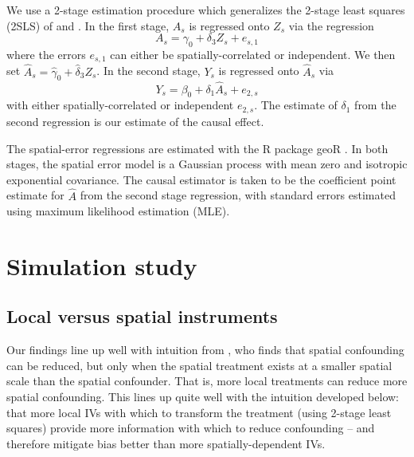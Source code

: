 \documentclass[12pt]{article}
\begin{document}
We use a 2-stage estimation procedure which generalizes the 2-stage least squares (2SLS) of  \cite{wright1928tariff} and \cite{theil1958economic}. In the first stage, $A_s$ is regressed onto $Z_s$ via the regression $$A_s = \gamma_0 + \delta_3 Z_s + e_{s,1}$$ where the errors $e_{s,1}$ can either be spatially-correlated or independent. We then set $\hat{A}_s = \hat{\gamma}_0 + \hat{\delta}_3 Z_s$. In the second stage, $Y_s$ is regressed onto $\hat{A}_s$ via $$Y_s = \beta_0 + \delta_1 \hat{A}_s + e_{2,s}$$ with either spatially-correlated or independent $e_{2,s}$.  The estimate of $\delta_1$ from the second regression is our estimate of the causal effect. 

The spatial-error regressions are estimated with the R package geoR \citep{geoR}. In both stages, the spatial error model is a Gaussian process with mean zero and isotropic exponential covariance. The causal estimator is taken to be the coefficient point estimate for $\hat{A}$ from the second stage regression, with standard errors estimated using maximum likelihood estimation (MLE). 



\section{Simulation study}\label{s3:sim}

\subsection{Local versus spatial instruments}\label{ss3:localVsSpatialZ}

Our findings line up well with intuition from \cite{paciorek2010importance}, who finds that spatial confounding can be reduced, but only when the spatial treatment exists at a smaller spatial scale than the spatial confounder. That is, more local treatments can reduce more spatial confounding. This lines up quite well with the intuition developed below: that more local IVs with which to transform the treatment (using 2-stage least squares) provide more information with which to reduce confounding -- and therefore mitigate bias better than more spatially-dependent IVs.  
\end{document}
